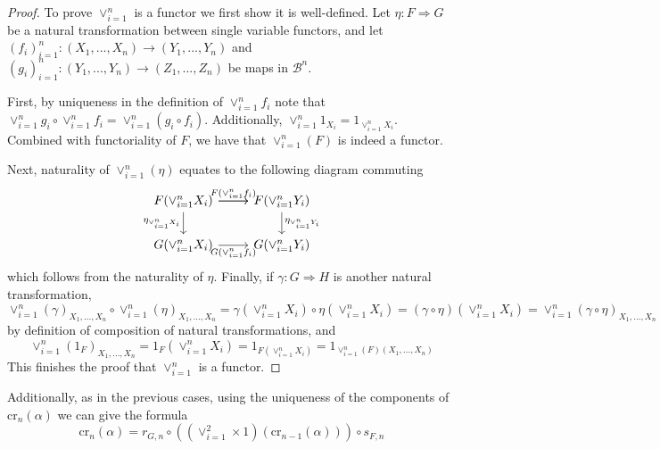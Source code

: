 \begin{proof}
    To prove $\lor_{i=1}^n$ is a functor we first show it is well-defined. Let $\eta:F\Rightarrow G$ be a natural transformation between single variable functors, and let $(f_i)_{i=1}^n:(X_1,...,X_n)\rightarrow (Y_1,...,Y_n)$ and $(g_i)_{i=1}^n:(Y_1,...,Y_n)\rightarrow (Z_1,...,Z_n)$ be maps in $\mathcal{B}^n$. 

    First, by uniqueness in the definition of $\lor_{i=1}^nf_i$ note that $\lor_{i=1}^ng_i\circ \lor_{i=1}^nf_i = \lor_{i=1}^n(g_i\circ f_i)$. Additionally, $\lor_{i=1}^n1_{X_i} = 1_{\lor_{i=1}^nX_i}$. Combined with functoriality of $F$, we have that $\lor_{i=1}^n(F)$ is indeed a functor.

    Next, naturality of $\lor_{i=1}^n(\eta)$ equates to the following diagram commuting
    \[\begin{tikzcd}
    	{F(\lor_{i=1}^nX_i)} & {F(\lor_{i=1}^nY_i)} \\
    	{G(\lor_{i=1}^nX_i)} & {G(\lor_{i=1}^nY_i)}
    	\arrow["{F(\lor_{i=1}^nf_i)}", from=1-1, to=1-2]
    	\arrow[from=1-1, to=1-2]
    	\arrow["{G(\lor_{i=1}^nf_i)}"', from=2-1, to=2-2]
    	\arrow["{\eta_{\lor_{i=1}^nX_i}}"', from=1-1, to=2-1]
    	\arrow["{\eta_{\lor_{i=1}^nY_i}}", from=1-2, to=2-2]
    \end{tikzcd}\]
    which follows from the naturality of $\eta$. Finally, if $\gamma:G\Rightarrow H$ is another natural transformation,
    \begin{equation*}
        \lor_{i=1}^n(\gamma)_{X_1,...,X_n}\circ \lor_{i=1}^n(\eta)_{X_1,...,X_n} = \gamma(\lor_{i=1}^nX_i)\circ \eta(\lor_{i=1}^nX_i) = (\gamma\circ\eta)(\lor_{i=1}^nX_i) = \lor_{i=1}^n(\gamma\circ \eta)_{X_1,...,X_n}
    \end{equation*}
    by definition of composition of natural transformations, and
    \begin{equation*}
        \lor_{i=1}^n(1_F)_{X_1,...,X_n} = 1_F(\lor_{i=1}^nX_i) = 1_{F(\lor_{i=1}^nX_i)} = 1_{\lor_{i=1}^n(F)(X_1,...,X_n)}
    \end{equation*}
    This finishes the proof that $\lor_{i=1}^n$ is a functor.
\end{proof}
Additionally, as in the previous cases, using the uniqueness of the components of $\text{cr}_n(\alpha)$ we can give the formula
\begin{equation}\label{eq:natProjFormulaN}
    \text{cr}_n(\alpha) = r_{G,n}\circ ((\lor_{i=1}^2\times 1)(\text{cr}_{n-1}(\alpha)))\circ s_{F,n}
\end{equation}

